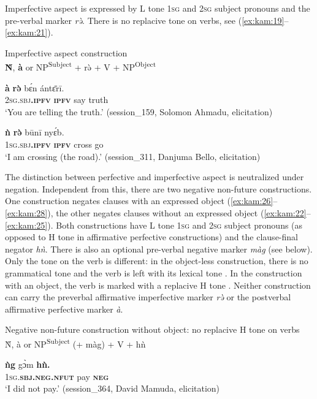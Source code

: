 \documentclass[output=paper,colorlinks,citecolor=brown]{langscibook}
\begin{document}
Imperfective aspect is expressed by L tone \textsc{1sg} and \textsc{2sg} subject pronouns and the pre-verbal marker \textit{rə̀}. There is no replacive tone on verbs, see (\ref{ex:kam:19}--\ref{ex:kam:21}).

\ea\label{ex:kam:19} 
     {Imperfective}  {aspect}  {construction}\\
    \textbf{\`{N}}, \textbf{à} or NP\textsuperscript{Subject} + rə̀ + V + NP\textsuperscript{Object}
\z 

\ea\label{ex:kam:20} 
    \gll \textbf{à} \textbf{rə̀} bɛ́n ántɛ̄rī.\\
        \textsc{2sg}.\textsc{sbj}\textbf{.\textsc{ipfv}} \textbf{\textsc{ipfv}} say truth\\
    \glt ‘You are telling the truth.’ (session\_159, Solomon Ahmadu, elicitation)
\z 

\ea\label{ex:kam:21} 
    \gll \textbf{ǹ} \textbf{rə̀} būnī nyɛ́b.\\
        \textsc{1sg.sbj}\textbf{\textsc{.ipfv}} \textbf{\textsc{ipfv}} cross go\\
    \glt ‘I am crossing (the road).’ (session\_311, Danjuma Bello, elicitation)
\z 

The distinction between perfective and imperfective aspect is neutralized under negation. Independent from this, there are two negative non-future constructions. One construction negates clauses with an expressed object (\ref{ex:kam:26}--\ref{ex:kam:28}), the other negates clauses without an expressed object (\ref{ex:kam:22}--\ref{ex:kam:25}). Both constructions have L tone \textsc{1sg} and \textsc{2sg} subject pronouns (as opposed to H tone in affirmative perfective constructions) and the clause-final negator \textit{hǹ}. There is also an optional pre-verbal negative marker \textit{màg} (see below). Only the tone on the verb is different: in the object-less construction, there is no grammatical tone and the verb is left with its lexical tone . In the construction with an object, the verb is marked with a replacive H tone . Neither construction can carry the preverbal affirmative imperfective marker \textit{rə̀} or the postverbal affirmative perfective marker \textit{à}.

\ea\label{ex:kam:22} 
    Negative non-future construction without object: no replacive H tone on verbs\\
    \`{N}, à or NP\textsuperscript{Subject} (+ màg) + V + hǹ
\z 

\ea\label{ex:kam:23} 
    \gll \textbf{ǹg} gɔ̀m \textbf{hǹ.}\\
        \textsc{1sg}.\textbf{\textsc{sbj}}\textbf{.\textsc{neg}}\textbf{.\textsc{nfut}} pay \textbf{\textsc{neg}}\\
    \glt ‘I did not pay.’ (session\_364, David Mamuda, elicitation)
\z 
\end{document}
